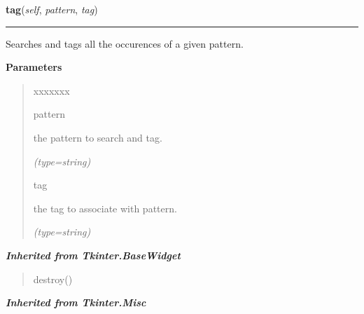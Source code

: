     \label{nMOLDYN:GUI:Widgets:ComboText:tag}

    \vspace{0.5ex}

\hspace{.8\funcindent}\begin{boxedminipage}{\funcwidth}

    \raggedright \textbf{tag}(\textit{self}, \textit{pattern}, \textit{tag})

    \vspace{-1.5ex}

    \rule{\textwidth}{0.5\fboxrule}
\setlength{\parskip}{2ex}
    Searches and tags all the occurences of a  given pattern.

\setlength{\parskip}{1ex}
      \textbf{Parameters}
      \vspace{-1ex}

      \begin{quote}
        \begin{Ventry}{xxxxxxx}

          \item[pattern]

          the pattern to search and tag.

            {\it (type=string)}

          \item[tag]

          the tag to associate with {\textbar}pattern{\textbar}.

            {\it (type=string)}

        \end{Ventry}

      \end{quote}

    \end{boxedminipage}


\large{\textbf{\textit{Inherited from Tkinter.BaseWidget}}}

\begin{quote}
destroy()
\end{quote}

\large{\textbf{\textit{Inherited from Tkinter.Misc}}}

